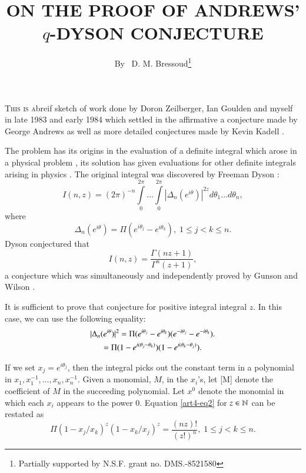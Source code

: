 
\title{ON THE PROOF OF ANDREWS' $q$-DYSON CONJECTURE}

\author{By~  D. M. Bressoud\footnote{Partially supported by N.S.F. grant no. DMS.-8521580}}

\date{}
\maketitle

\setcounter{page}{35} 
\setcounter{pageoriginal}{30} 


\textsc{This is a}\pageoriginale breif sketch of work done by Doron Zeilberger, Ian Goulden and myself in late 1983 and early 1984 which settled in the affirmative a conjecture made by George Andrews \cite{art4-key1} as well as more detailed conjectures made by Kevin Kadell \cite{art4-key12}.

The problem has its origins in the evaluation of a definite integral which arose in a physical problem \cite{art4-key5}, its solution has given evaluations for other definite integrals arising in physics \cite{art4-key4}. The original integral was discovered by Freeman Dyson \cite{art4-key5}:
\begin{equation}
I (n,z) = (2\pi)^{-n} \int\limits^{2\pi}_0 \ldots \int\limits^{2\pi}_0 |\Delta_n(e^{i\theta})|^{2z} d \theta_1 \ldots d \theta_n, \label{art4-eq1}
\end{equation}
where 
$$
\Delta_n(e^{i\theta}) = \Pi (e^{i\theta_j} - e^{i\theta_k}), \; 1 \leqslant j < k \leqslant n.
$$
Dyson conjectured that 
\begin{equation}
I (n,z) = \frac{\Gamma (nz+1)}{\Gamma^n (z+1)}, \label{art4-eq2}
\end{equation}
a conjecture which was simultaneously and independently proved by Gunson \cite{art4-key7} and Wilson \cite{art4-key23}.

It is sufficient to prove that conjecture for positive integral integral $z$. In this case, we can use the following equality:
\begin{gather}
|\Delta_n (e^{i\theta})|^2 = \Pi (e^{i\theta_j} - e^{i\theta_k}) (e^{-i\theta_j} - e^{-i\theta_k}).\label{art4-eq3}\\
= \Pi (1-e^{i(\theta_j - \theta_k)}) (1-e^{i(\theta_k -\theta_j)}).\notag
\end{gather}

If we set $x_j =e^{i\theta_j}$, then the integral picks out the constant term in a polynomial in $x_1, x^{-1}_1, \ldots, x_n, x^{-1}_n$. Given a monomial, $M$, in the $x_i$'s, let [M] denote the coefficient of $M$ in the succeeding polynomial. Let $x^0$ denote the monomial in which each $x_i$ appears to the power 0. Equation \eqref{art4-eq2} for $z \in \mathbb{N}$ can be restated as
\begin{equation}
[x^0] \Pi (1-x_j/x_k)^z (1-x_k/x_j)^z = \frac{(nz)!}{(z!)^n}, \; 1 \leqslant j < k \leqslant n. \label{art4-eq4}
\end{equation}\pageoriginale 

